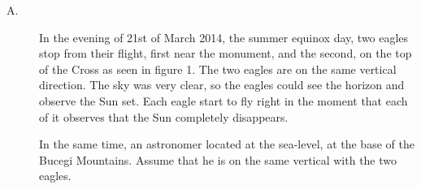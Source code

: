\begin{description}
\item[A.] In the evening of 21st of March 2014, the summer equinox day, two %
  eagles stop from their flight, first near the monument, and the second, on
  the top of the Cross as seen in figure 1. The two eagles are on the same
  vertical direction. The sky was very clear, so the eagles could see the
  horizon and observe the Sun set. Each eagle start to fly right in the moment
  that each of it observes that the Sun completely disappears.

  In the same time, an astronomer located at the sea-level, at the base of the
  Bucegi Mountains. Assume that he is on the same vertical with the two
  eagles.



\end{description}
